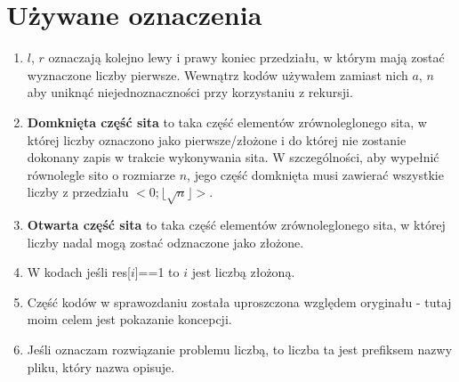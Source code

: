 \documentclass[12pt]{article}
\begin{document}
\section{Używane oznaczenia}
\begin{enumerate}
	\item \(l\), \(r\) oznaczają kolejno lewy i prawy koniec przedziału, w którym mają zostać wyznaczone liczby pierwsze. Wewnątrz kodów używałem zamiast nich \(a\), \(n\) aby uniknąć niejednoznaczności przy korzystaniu z rekursji.
	\item \textbf{Domknięta część sita} to taka część elementów zrównoleglonego sita, w której liczby oznaczono jako pierwsze/złożone i do której nie zostanie dokonany zapis w trakcie wykonywania sita. W szczególności, aby wypełnić równolegle sito o rozmiarze \(n\), jego część domknięta musi zawierać wszystkie liczby z przedziału \(<0;\lfloor\sqrt{n}\rfloor>\).
	\item \textbf{Otwarta część sita} to taka część elementów zrównoleglonego sita, w której liczby nadal mogą zostać odznaczone jako złożone.
	\item W kodach jeśli res[\(i\)]==1 to \(i\) jest liczbą złożoną.
	\item Część kodów w sprawozdaniu została uproszczona względem oryginału - tutaj moim celem jest pokazanie koncepcji.
	\item Jeśli oznaczam rozwiązanie problemu liczbą, to liczba ta jest prefiksem nazwy pliku, który nazwa opisuje.
\end{enumerate}
\end{document}

